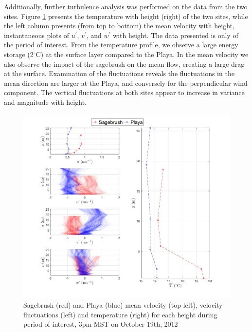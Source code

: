 \documentclass[]{article}
\begin{document}
Additionally, further turbulence analysis was performed on the data from the two sites. Figure \ref{fig:u_T} presents the temperature with height (right) of the two sites, while the left column presents (from top to bottom) the mean velocity with height, instantaneous plots of $u^\prime$,  $v^\prime$, and $w^\prime$ with height. The data presented is only of the period of interest. From the temperature profile, we observe a large energy storage (2$^\circ$C) at the surface layer compared to the Playa. In the mean velocity we also observe the impact of the sagebrush on the mean flow, creating a large drag at the surface. Examination of the fluctuations reveals the fluctuations in the mean direction are larger at the Playa, and conversely for the perpendicular wind component. The vertical fluctuations at both sites appear to increase in variance and magnitude with height.  
\begin{figure}
	\centering
	\includegraphics[width=\textwidth]{u_T}
	\caption{Sagebrush (red) and Playa (blue) mean velocity (top left), velocity fluctuations (left) and temperature (right) for each height during period of interest, 3pm MST on October 19th, 2012}
	\label{fig:u_T}
\end{figure}
\end{document}
